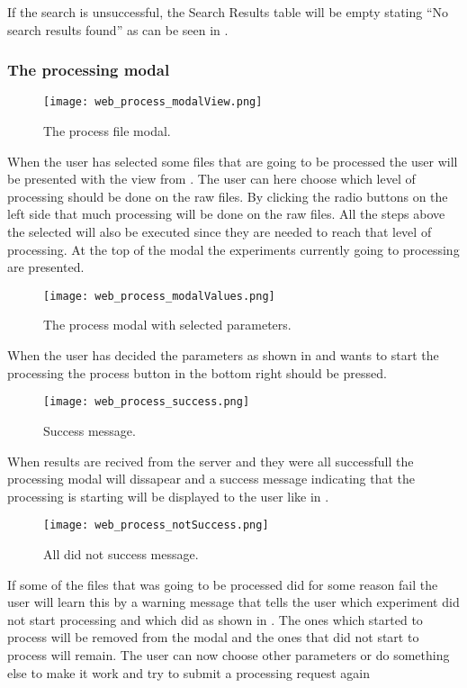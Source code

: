 If the search is unsuccessful, the Search Results table will be empty stating “No search results found” as can be seen in .

\subsubsection{The processing modal}
\begin{figure}[h]
\centering
\texttt{[image: web\_process\_modalView.png]}
\caption{\label{fig:web_process_modalView}The process file modal.}
\end{figure}
\FloatBarrier
When the user has selected some files that are going to be processed the user will be presented with the view from . The user can here choose which level of processing should be done on the raw files. By clicking the radio buttons on the left side that much processing will be done on the raw files. All the steps above the selected will also be executed since they are needed to reach that level of processing.
At the top of the modal the experiments currently going to processing are presented.
\begin{figure}[h]
\centering
\texttt{[image: web\_process\_modalValues.png]}
\caption{\label{fig:web_process_modalValues}The process modal with selected parameters.}
\end{figure}
\FloatBarrier
When the user has decided the parameters as shown in  and wants to start the processing the process button in the bottom right should be pressed. 
\begin{figure}[h]
\centering
\texttt{[image: web\_process\_success.png]}
\caption{\label{fig:web_process_success}Success message.}
\end{figure}
\FloatBarrier
When results are recived from the server and they were all successfull the processing modal will dissapear and a success message indicating that the processing is starting will be displayed to the user like in .
\begin{figure}[h]
\centering
\texttt{[image: web\_process\_notSuccess.png]}
\caption{\label{fig:web_process_notSuccess}All did not success message.}
\end{figure}
If some of the files that was going to be processed did for some reason fail the user will learn this by a warning message that tells the user which experiment did not start processing and which did as shown in . The ones which started to process will be removed from the modal and the ones that did not start to process will remain. The user can now choose other parameters or do something else to make it work and try to submit a processing request again
\pagebreak

